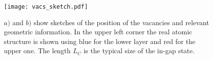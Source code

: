 \documentclass[a4paper]{article}
\begin{document}
\begin{figure}[h!]
\centering
\texttt{[image: vacs\_sketch.pdf]}
\vspace{-10pt}
\caption{$a)$ and $b)$ show sketches of the position of the vacancies and relevant geometric information. In the upper left corner the real atomic structure is shown using blue for the lower layer and red for the upper one. The length $L_C$ is the typical size of the in-gap state.} %
\label{geo_sketch}
\end{figure}
\FloatBarrier
\end{document}
